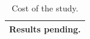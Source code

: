 \begin{table}[t]
\centering\small
\begin{tabular}{l}
\toprule
Results pending. \\
\bottomrule
\end{tabular}
\caption{Cost of the study.}
\label{tab:study_cost}
\end{table}
